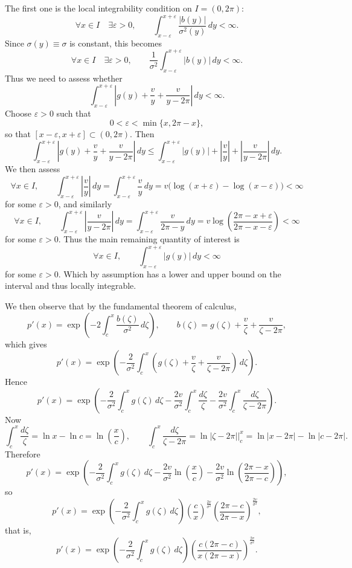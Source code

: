 \documentclass[11pt]{article}
\newcommand{\1}{\mathbbm{1}}
\theoremstyle{plain}
\theoremstyle{definition}
\theoremstyle{remark}
\begin{document}
The first one is the local integrability condition on $I=(0,2\pi)$:
\[
\forall x \in I \quad \exists \varepsilon > 0, \qquad \int_{x-\varepsilon}^{x+\varepsilon} \frac{|b(y)|}{\sigma^2(y)}\,dy < \infty.
\]
Since $\sigma(y)\equiv \sigma$ is constant, this becomes
\[
\forall x \in I \quad \exists \varepsilon > 0, \qquad \frac{1}{\sigma^2}\int_{x-\varepsilon}^{x+\varepsilon} |b(y)|\,dy < \infty.
\]
Thus we need to assess whether
\[
\int_{x-\varepsilon}^{x+\varepsilon} \left|g(y)+\frac{v}{y} +\frac{v}{y-2\pi}\right|\,dy  < \infty.
\]
Choose $\varepsilon>0$ such that
\[
0<\varepsilon<\min\{x,2\pi-x\},
\]
so that $[x-\varepsilon,x+\varepsilon]\subset (0,2\pi)$. Then
\[
\int_{x-\varepsilon}^{x+\varepsilon} \left|g(y)+\frac{v}{y} +\frac{v}{y-2\pi}\right|\,dy
\leq
\int_{x-\varepsilon}^{x+\varepsilon} |g(y)|+ \left|\frac{v}{y}\right| +\left|\frac{v}{y-2\pi}\right|\,dy.
\]
We then assess
\[
\forall x \in I, \qquad \int_{x-\varepsilon}^{x+\varepsilon} \left|\frac{v}{y}\right|\,dy
=
\int_{x-\varepsilon}^{x+\varepsilon} \frac{v}{y}\,dy
=
v\bigl(\log(x+\varepsilon)-\log(x-\varepsilon)\bigr) < \infty
\]
for some $\varepsilon > 0$, and similarly
\[
\forall x \in I, \qquad \int_{x-\varepsilon}^{x+\varepsilon} \left|\frac{v}{y-2\pi}\right|\,dy
=
\int_{x-\varepsilon}^{x+\varepsilon} \frac{v}{2\pi-y}\,dy
=
v\log\!\left(\frac{2\pi-x+\varepsilon}{2\pi-x-\varepsilon}\right) < \infty
\]
for some $\varepsilon > 0$. Thus the main remaining quantity of interest is
\[
\forall x \in I, \qquad \int_{x-\varepsilon}^{x+\varepsilon} |g(y)|\,dy < \infty
\]
for some $\varepsilon > 0$. Which by assumption has a lower and upper bound on the interval and thus locally integrable. 

We then observe that by the fundamental theorem of calculus,
\[
p'(x)=\exp\!\left(-2\int_c^x \frac{b(\zeta)}{\sigma^2}\,d\zeta\right),
\qquad
b(\zeta)=g(\zeta)+\frac{v}{\zeta}+\frac{v}{\zeta-2\pi},
\]
which gives
\[
p'(x)=\exp\!\left(-\frac{2}{\sigma^2}\int_c^x \left(g(\zeta)+\frac{v}{\zeta}+\frac{v}{\zeta-2\pi}\right)\,d\zeta\right).
\]
Hence
\[
p'(x)=\exp\!\left(-\frac{2}{\sigma^2}\int_c^x g(\zeta)\,d\zeta-\frac{2v}{\sigma^2}\int_c^x \frac{d\zeta}{\zeta}-\frac{2v}{\sigma^2}\int_c^x \frac{d\zeta}{\zeta-2\pi}\right).
\]
Now
\[
\int_c^x \frac{d\zeta}{\zeta}=\ln x-\ln c=\ln\!\left(\frac{x}{c}\right),
\qquad
\int_c^x \frac{d\zeta}{\zeta-2\pi}
=
\ln|\zeta-2\pi|\Big|_c^x
=
\ln|x-2\pi|-\ln|c-2\pi|.
\]
Therefore
\[
p'(x)=\exp\!\left(-\frac{2}{\sigma^2}\int_c^x g(\zeta)\,d\zeta-\frac{2v}{\sigma^2}\ln\!\left(\frac{x}{c}\right)-\frac{2v}{\sigma^2}\ln\!\left(\frac{2\pi-x}{2\pi-c}\right)\right),
\]
so
\[
p'(x)=\exp\!\left(-\frac{2}{\sigma^2}\int_c^x g(\zeta)\,d\zeta\right)\left(\frac{c}{x}\right)^{\frac{2v}{\sigma^2}}\left(\frac{2\pi-c}{2\pi-x}\right)^{\frac{2v}{\sigma^2}},
\]
that is,
\[
p'(x)=\exp\!\left(-\frac{2}{\sigma^2}\int_c^x g(\zeta)\,d\zeta\right)\left(\frac{c(2\pi-c)}{x(2\pi-x)}\right)^{\frac{2v}{\sigma^2}}.
\]
\end{document}
